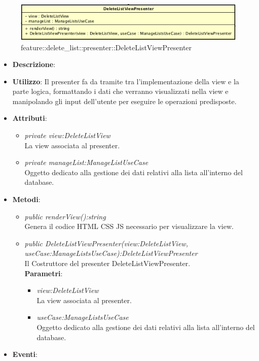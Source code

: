 \label{feature::delete_list::presenter::DeleteListViewPresenter}
\begin{figure}[ht]
	\centering
	\includegraphics[scale=0.5]{Sezioni/SottosezioniST/img/app/DeleteListViewPresenter.png}
	\caption{feature::delete\_list::presenter::DeleteListViewPresenter}
\end{figure}

\begin{itemize}
\item \textbf{Descrizione}: 
\item \textbf{Utilizzo}: Il presenter fa da tramite tra l'implementazione della view e la parte logica, formattando i dati che verranno visualizzati nella view e manipolando gli input dell'utente per eseguire le operazioni predisposte.
\item \textbf{Attributi}: 
	\begin{itemize}
	\item \textit{private view:DeleteListView}\\
		La view associata al presenter.
	\item \textit{private manageList:ManageListUseCase}\\
				Oggetto dedicato alla gestione dei dati relativi alla lista all'interno del database.
	\end{itemize}
\item \textbf{Metodi}:
	\begin{itemize}
	\item \textit{public renderView():string}\\
	Genera il codice HTML CSS JS necessario per visualizzare la view.
	\item \textit{public DeleteListViewPresenter(view:DeleteListView, useCase:ManageListsUseCase):DeleteListViewPresenter}\\
	Il Costruttore del presenter DeleteListViewPresenter.
		\\ \textbf{Parametri}: \begin{itemize}
		\item \textit{view:DeleteListView}\\
			La view associata al presenter.
		\item \textit{useCase:ManageListsUseCase}\\
			Oggetto dedicato alla gestione dei dati relativi alla lista all'interno del database.
		\end{itemize} 
	\end{itemize}
\item \textbf{Eventi}:
\end{itemize}